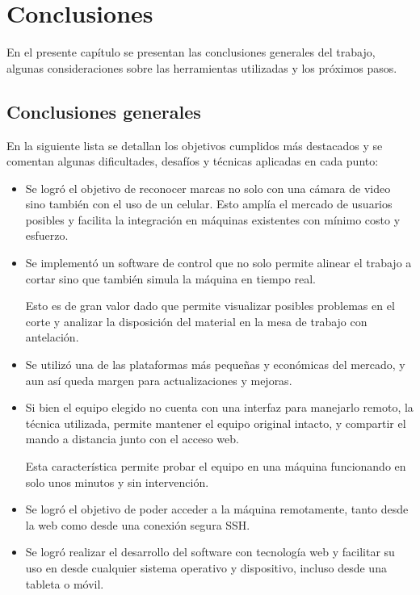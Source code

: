 \chapter{Conclusiones}
\label{Chapter5}
En el presente capítulo se presentan las conclusiones generales del trabajo, algunas consideraciones sobre las herramientas utilizadas y los próximos pasos.

\section{Conclusiones generales }

En la siguiente lista se detallan los objetivos cumplidos más destacados y se comentan algunas dificultades, desafíos y técnicas aplicadas en cada punto:

\begin{itemize}
   \item{Se logró el objetivo de reconocer marcas no solo con una cámara de video sino también con el uso de un celular. Esto amplía el mercado de usuarios posibles y facilita la integración en máquinas existentes con mínimo costo y esfuerzo.}

   \item{Se implementó un software de control que no solo permite alinear el trabajo a cortar sino que también simula la máquina en tiempo real.\par 
      Esto es de gran valor dado que permite visualizar posibles problemas en el corte y analizar la disposición del material en la mesa de trabajo con antelación.}

   \item{Se utilizó una de las plataformas más pequeñas y económicas del mercado, y aun así queda margen para actualizaciones y mejoras.}

   \item{Si bien el equipo elegido no cuenta con una interfaz para manejarlo remoto, la técnica utilizada, permite mantener el equipo original intacto, y compartir el mando a distancia junto con el acceso web. \par
      Esta característica permite probar el equipo en una máquina funcionando en solo unos minutos y sin intervención.}

   \item{Se logró el objetivo de poder acceder a la máquina remotamente, tanto desde la web como desde una conexión segura SSH.}

   \item{Se logró realizar el desarrollo del software con tecnología web y facilitar su uso en desde cualquier sistema operativo y dispositivo, incluso desde una tableta o móvil.}


\end{itemize}

